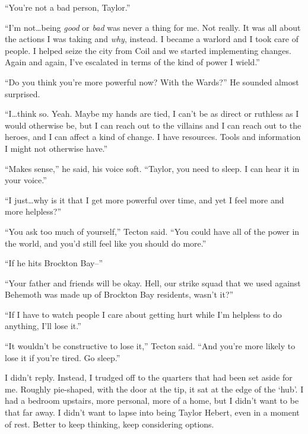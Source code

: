 ``You're not a bad person, Taylor.''



``I'm not\ldots being \emph{good} or \emph{bad} was never a thing for me.  Not really.  It was all about the actions I was taking and \emph{why}, instead.  I became a warlord and I took care of people.  I helped seize the city from Coil and we started implementing changes.  Again and again, I've escalated in terms of the kind of power I wield.''



``Do you think you're more powerful now?  With the Wards?''  He sounded almost surprised.



``I\ldots think so.  Yeah.  Maybe my hands are tied, I can't be as direct or ruthless as I would otherwise be, but I can reach out to the villains and I can reach out to the heroes, and I can affect a kind of change.  I have resources.  Tools and information I might not otherwise have.''



``Makes sense,'' he said, his voice soft.  ``Taylor, you need to sleep.  I can hear it in your voice.''



``I just\ldots why is it that I get more powerful over time, and yet I feel more and more helpless?''



``You ask too much of yourself,'' Tecton said.  ``You could have all of the power in the world, and you'd still feel like you should do more.''



``If he hits Brockton Bay--''



``Your father and friends will be okay.  Hell, our strike squad that we used against Behemoth was made up of Brockton Bay residents, wasn't it?''



``If I have to watch people I care about getting hurt while I'm helpless to do anything, I'll lose it.''



``It wouldn't be constructive to lose it,'' Tecton said.  ``And you're more likely to lose it if you're tired.  Go sleep.''



I didn't reply.  Instead, I trudged off to the quarters that had been set aside for me.  Roughly pie-shaped, with the door at the tip, it sat at the edge of the `hub'.  I had a bedroom upstairs, more personal, more of a home, but I didn't want to be that far away.  I didn't want to lapse into being Taylor Hebert, even in a moment of rest.  Better to keep thinking, keep considering options.



